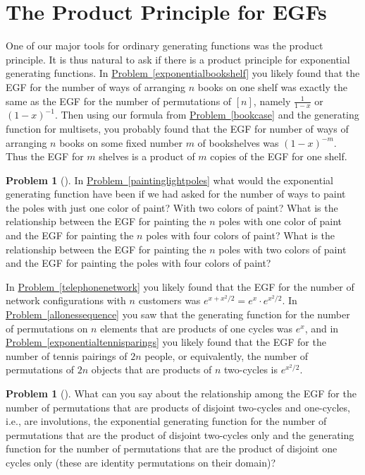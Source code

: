 \documentclass[10pt,]{book}
\theoremstyle{plain}
\theoremstyle{definition}
\newtheorem{activity}[project]{Problem}
\theoremstyle{definition}
\numberwithin{equation}{chapter}
\begin{document}
\section[{The Product Principle for EGFs}]{The Product Principle for EGFs}\label{app3-4-prodprinc}
One of our major tools for ordinary generating functions was the product principle. It is thus natural to ask if there is a product principle for exponential generating functions. In \hyperref[exponentialbookshelf]{Problem~\ref{exponentialbookshelf}} you likely found that the EGF for the number of ways of arranging \(n\) books on one shelf was exactly the same as the EGF for the number of permutations of \([n]\), namely \(\frac{1}{1-x}\) or \((1-x)^{-1}\). Then using our formula from \hyperref[bookcase]{Problem~\ref{bookcase}} and the generating function for multisets, you probably found that the EGF for number of ways of arranging \(n\) books on some fixed number \(m\) of bookshelves was \((1-x)^{-m}\). Thus the EGF for \(m\) shelves is a product of \(m\) copies of the EGF for one shelf.%
\begin{activity}[] \label{paintinglightpoles2}
In \hyperref[paintinglightpoles]{Problem~\ref{paintinglightpoles}} what would the exponential generating function have been if we had asked for the number of ways to paint the poles with just one color of paint? With two colors of paint? What is the relationship between the EGF for painting the \(n\) poles with one color of paint and the EGF for painting the \(n\) poles with four colors of paint? What is the relationship between the EGF for painting the \(n\) poles with two colors of paint and the EGF for painting the poles with four colors of paint?%
\end{activity}
In \hyperref[telephonenetwork]{Problem~\ref{telephonenetwork}} you likely found that the EGF for the number of network configurations with \(n\) customers was \(e^{x+x^2/2}= e^x \cdot
e^{x^2/2}\). In \hyperref[allonessequence]{Problem~\ref{allonessequence}} you saw that the generating function for the number of permutations on \(n\) elements that are products of one cycles was \(e^x\), and in \hyperref[exponentialtennisparings]{Problem~\ref{exponentialtennisparings}} you likely found that the EGF for the number of tennis pairings of \(2n\) people, or equivalently, the number of permutations of \(2n\) objects that are products of \(n\) two-cycles is \(e^{x^2/2}\).%
\begin{activity}[] \label{x2cyclesand1cycles}
What can you say about the relationship among the EGF for the number of permutations that are products of disjoint two-cycles and one-cycles, i.e., are involutions, the exponential generating function for the number of permutations that are the product of disjoint two-cycles only and the generating function for the number of permutations that are the product of disjoint one cycles only (these are identity permutations on their domain)?%
\end{activity}
\end{document}
